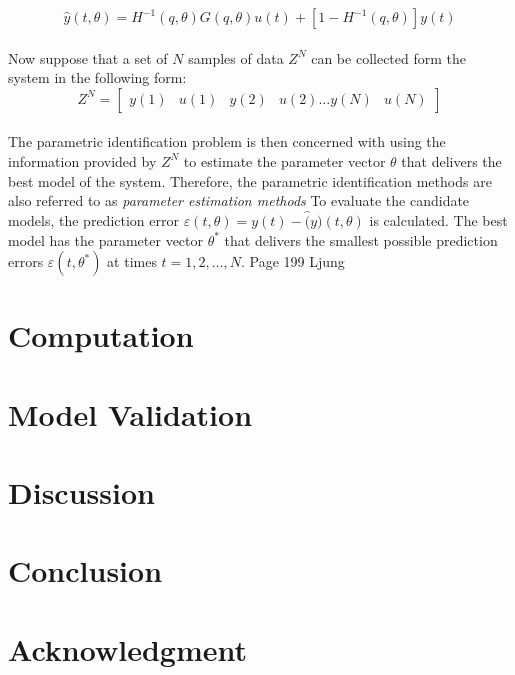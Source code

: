 \documentclass[9pt, twoside]{article}
\begin{document}
\begin{multicols}{2}
 \begin{equation}
 \label{predictor}
 \hat{y}(t,\theta)=H^{-1}(q,\theta)G(q,\theta)u(t)+[1-H^{-1}(q,\theta)]y(t)
 \end{equation}
\\
Now suppose that a set of $N$ samples of data $Z^N$ can be collected form the system in the following form:\\
\begin{equation}
Z^N=\begin{bmatrix}
y(1)&u(1)&y(2)&u(2)\dots y(N)&u(N)
\end{bmatrix}
\end{equation}\\
The parametric identification problem is then concerned with using the information provided by $Z^N$ to estimate the parameter vector $\theta$ that delivers the best model of the system. Therefore, the parametric identification methods are also referred to as \textit{parameter estimation methods} To evaluate the candidate models, the prediction error $\varepsilon(t,\theta)=y(t)-\hat(y)(t,\theta)$ is calculated. The best model has the parameter vector $\theta^*$ that delivers the smallest possible prediction errors $\varepsilon(t,\theta^*)$ at times $t=1,2,\dots, N$. Page 199 Ljung

 
 

\section{Computation}

\section{Model Validation}

\section{Discussion}


\section{Conclusion}


\section*{Acknowledgment}








\end{multicols}
{}

\end{document}
